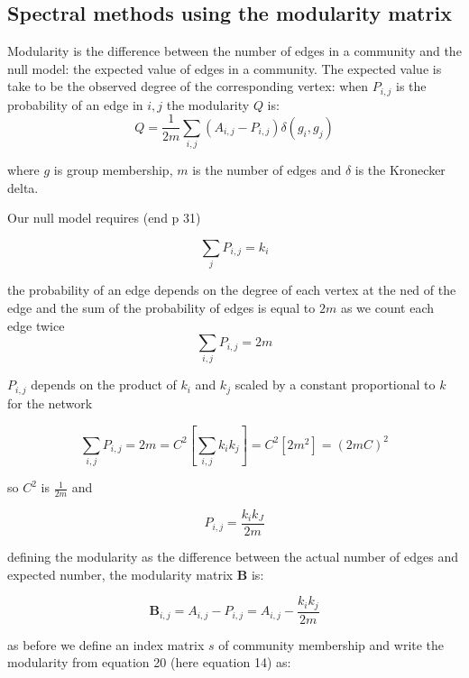 \subsection{Spectral methods using the modularity matrix}

Modularity is the difference between the number of edges in a community and the null model: the expected value of edges in a community. The expected value is take to be the observed degree of the corresponding vertex: when $P_{i,j}$ is the probability of an edge in $i,j$ the modularity $Q$ is:
\begin{equation}
Q = \frac{1}{2m} \sum_{i,j} (A_{i,j}-P_{i,j})\delta(g_i,g_j)
\end{equation}

where $g$ is group membership, $m$ is the number of edges and $\delta$ is the Kronecker delta.

Our null model requires (end p 31)

\begin{equation}
\sum_j P_{i,j}=k_i	
\end{equation}

the probability of an edge depends on the degree of each vertex at the ned of the edge and the sum of the probability of edges is equal to $2m$ as we count each edge twice
\begin{equation}
	\sum_{i,j} P_{i,j}=2m
\end{equation}

$P_{i,j}$ depends on the product of $k_i$ and $k_j$ scaled by a constant proportional to $k$ for the network

\begin{equation}
	\sum_{i,j}P_{i,j}=2m=C^2[\sum_{i,j} k_i k_j] = C^2[2m^2]=(2mC)^2
\end{equation} 

so $C^2$ is $\frac{1}{2m}$ and

\begin{equation}
	P_{i,j} = \frac{k_i k_J}{2m}
\end{equation}

defining the modularity as the difference between the actual number of edges and expected number, the modularity matrix $\mathbf{B}$ is:

\begin{equation}
\mathbf{B}_{i,j} = A_{i,j} - P_{i,j} = A_{i,j} - \frac{k_i k_j}{2m}
\end{equation}
\label{eq:modularity matrix B}

as before we define an index matrix $s$ of community membership and write the modularity from equation 20 (here equation 14) as:

